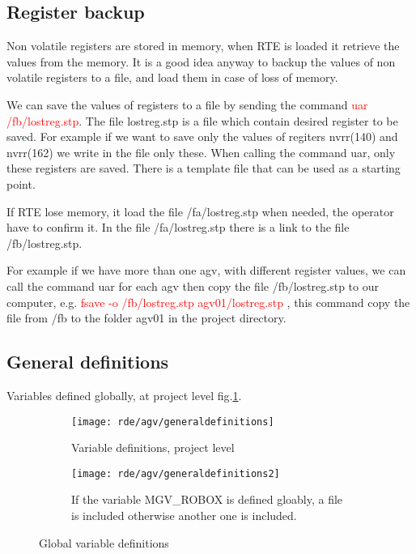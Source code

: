 \subsection{Register backup}
Non volatile registers are stored in memory, when RTE is loaded it retrieve the values from the memory. It is a good idea anyway to backup the values of non volatile registers to a file, and load them in case of loss of memory.

We can save the values of registers to a file by sending the command \textcolor{red}{uar /fb/lostreg.stp}. The file lostreg.stp is a file which contain desired register to be saved. For example if we want to save only the values of regiters nvrr(140) and nvrr(162) we write in the file only these. When calling the command uar, only these registers are saved. There is a template file that can be used as a starting point.

If RTE lose memory, it load the file /fa/lostreg.stp when needed, the operator have to confirm it. In the file /fa/lostreg.stp there is a link to the file /fb/lostreg.stp.

For example if we have more than one agv, with different register values, we can call the command uar for each agv then copy the file /fb/lostreg.stp to our computer, e.g. \textcolor{red}{fsave -o /fb/lostreg.stp agv01/lostreg.stp} , this command copy the file from /fb to the folder agv01 in the project directory.

\subsection{General definitions}
Variables defined globally, at project level fig.\ref{fig:generaldefinitions}.
\begin{figure}[h]
	\centering
	\begin{subfigure}[h]{0.4\textwidth}
		\texttt{[image: rde/agv/generaldefinitions]}
		\caption{Variable definitions, project level}
		\label{fig:generaldefinitions}
	\end{subfigure}
	
	\begin{subfigure}[h]{0.4\textwidth}
		\texttt{[image: rde/agv/generaldefinitions2]}
		\caption{If the variable MGV\_ROBOX is defined gloably, a file is included otherwise another one is included.}
		\label{fig:generaldefinitions2}
	\end{subfigure}
	\label{fig:generaldefinition}
	\caption{Global variable definitions}
\end{figure}

